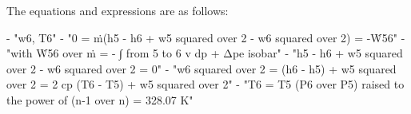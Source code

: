 The equations and expressions are as follows:

- "w6, T6"
- "0 = ṁ(h5 - h6 + w5 squared over 2 - w6 squared over 2) = -Ẇ56"
- "with Ẇ56 over ṁ = - ∫ from 5 to 6 v dp + Δpe isobar"
- "h5 - h6 + w5 squared over 2 - w6 squared over 2 = 0"
- "w6 squared over 2 = (h6 - h5) + w5 squared over 2 = 2 cp (T6 - T5) + w5 squared over 2"
- "T6 = T5 (P6 over P5) raised to the power of (n-1 over n) = 328.07 K"
